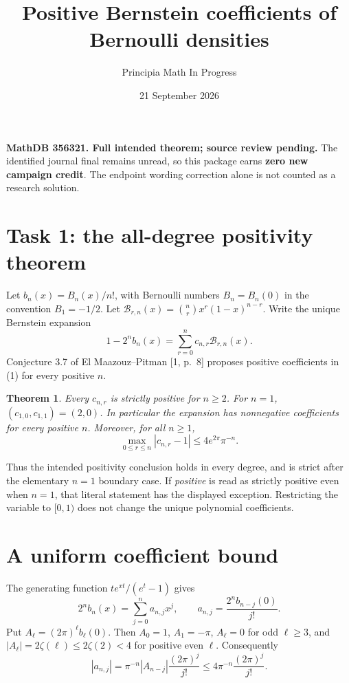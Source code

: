\documentclass[11pt]{article}
\title{Positive Bernstein coefficients of Bernoulli densities}
\author{Principia Math In Progress}
\date{21 September 2026}
\newtheorem{theorem}{Theorem}
\newcommand{\bb}{\mathcal B}
\begin{document}
\maketitle
\noindent\textbf{MathDB 356321. Full intended theorem; source review pending.}
The identified journal final remains unread, so this package earns
\textbf{zero new campaign credit}. The endpoint wording correction alone
is not counted as a research solution.

\section*{Task 1: the all-degree positivity theorem}
Let \(b_n(x)=B_n(x)/n!\), with Bernoulli numbers \(B_n=B_n(0)\) in the
convention \(B_1=-1/2\). Let
\(\bb_{r,n}(x)=\binom nr x^r(1-x)^{n-r}\).
Write the unique Bernstein expansion
\[
 1-2^n b_n(x)=\sum_{r=0}^n c_{n,r}\bb_{r,n}(x).
 \tag{1}
\]
Conjecture 3.7 of El Maazouz--Pitman [1, p.~8] proposes positive
coefficients in (1) for every positive \(n\).
\begin{theorem}
Every \(c_{n,r}\) is strictly positive for \(n\geq2\). For \(n=1\),
\((c_{1,0},c_{1,1})=(2,0)\). In particular the expansion has nonnegative
coefficients for every positive \(n\). Moreover, for all \(n\geq1\),
\[
 \max_{0\leq r\leq n}|c_{n,r}-1|
       \leq 4 e^{2\pi}\pi^{-n}.
 \tag{2}
\]
\end{theorem}
\noindent Thus the intended positivity conclusion holds in every degree,
and is strict after the elementary \(n=1\) boundary case.
If \emph{positive} is read as strictly positive even when \(n=1\),
that literal statement has the displayed exception. Restricting the
variable to \([0,1)\) does not change the unique polynomial coefficients.

\section*{A uniform coefficient bound}
The generating function \(te^{xt}/(e^t-1)\) gives
\[
 2^n b_n(x)=\sum_{j=0}^n a_{n,j}x^j,\qquad
 a_{n,j}=\frac{2^n b_{n-j}(0)}{j!}.
\]
Put \(A_\ell=(2\pi)^\ell b_\ell(0)\). Then \(A_0=1\),
\(A_1=-\pi\), \(A_\ell=0\) for odd \(\ell\geq3\), and
\(|A_\ell|=2\zeta(\ell)\leq2\zeta(2)<4\) for positive even \(\ell\).
Consequently
\[
 |a_{n,j}|=\pi^{-n}|A_{n-j}|\frac{(2\pi)^j}{j!}
       \leq4\pi^{-n}\frac{(2\pi)^j}{j!}.
 \tag{3}
\]
\newpage
\end{document}
